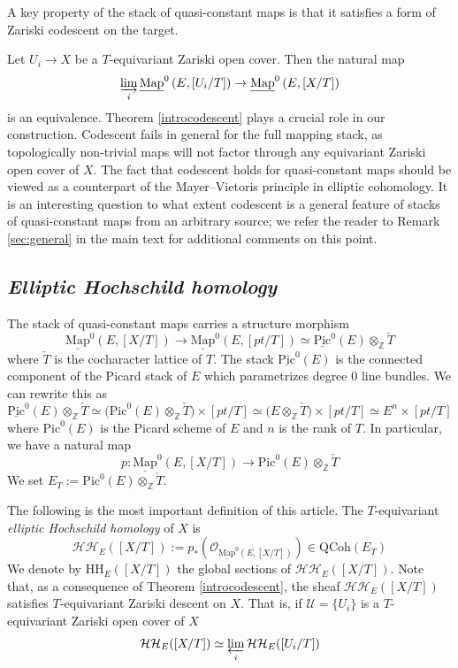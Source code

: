 \documentclass[11pt,letterpaper]{amsart}
\newenvironment{customthm}[1]
{\renewcommand\theinnercustomthm{#1}\innercustomthm}
  {\endinnercustomthm}
\newenvironment{customdef}[1]
{\renewcommand\theinnercustomdef{#1}\innercustomdef}
  {\endinnercustomdef}
\newcommand{\cU}{\mathcal{U}}
\newcommand{\Mapo}[2]{\underline{\mathrm{Map}}^{0}\left (#1,#2\right )}
\newcommand{\Pic}{\underline{\mathrm{Pic}}}
\newcommand{\QCoh}{\mathrm{QCoh}}
\begin{document}
A key property of the stack of quasi-constant maps is that it satisfies a form of Zariski codescent on the target. 



\begin{customthm}{A}[Theorem \ref{proposition:codescentnormalvar}]
\label{introcodescent}
Let $U_i \to X$ be a $T$-equivariant Zariski open cover. Then the natural map
$$
\varinjlim_i \Mapo{E}{[U_i/T]} \to 
\Mapo{E}{[X/T]}
$$
is an equivalence.
\end{customthm}
Theorem \ref{introcodescent} plays a crucial role in our construction. Codescent fails in general for the full mapping stack, as topologically non-trivial maps will not factor through any equivariant Zariski open cover of $X$. The fact that codescent holds for quasi-constant maps should be viewed as a counterpart of the Mayer--Vietoris principle in elliptic cohomology. It is an interesting question to what extent codescent is a general feature of  stacks of quasi-constant maps from an arbitrary source;  we refer the reader to Remark \ref{sec:general} in the main text for additional comments on this point. 

\subsection*{\emph{Elliptic Hochschild homology}}

The stack of quasi-constant maps carries a structure morphism  
$$
\Mapo{E}{[X/T]} \to \Mapo{E}{[pt/T]} \simeq \Pic^0(E) \otimes_\mathbb{Z} \check{T}
$$
where $\check{T}$ is the cocharacter lattice of $T$. The stack $\Pic^0(E)$ is the connected component of the Picard stack of $E$ which parametrizes degree $0$ line bundles. We can  rewrite this as 
$$
\Pic^0(E)\otimes_\mathbb{Z} \check{T}  \simeq \big ( \mathrm{Pic}^0(E)\otimes_\mathbb{Z} \check{T}\big ) \times [pt/T] 
 \simeq \big ( E \otimes_\mathbb{Z} \check{T} \big )\times [pt/T]  \simeq E^n \times [pt/T] 
$$
where $\mathrm{Pic}^0(E)$ is the Picard scheme of $E$ and $n$ is the rank of $T$. In particular, we have a natural map
$$
p: \Mapo{E}{[X/T]} \longrightarrow \mathrm{Pic}^0(E)  \otimes_\mathbb{Z} \check{T}
$$
We set $E_T:=\mathrm{Pic}^0(E)  \otimes_\mathbb{Z} \check{T}$.

The following is the most important definition of this article.
\begin{customdef}{B}[Definition \ref{elliptichoch}]
\label{mainintro}
The $T$-equivariant \emph{elliptic Hochschild homology}  of $X$ is 
$$
\mathcal{HH}_E([X/T]):=p_*(\mathcal{O}_{\Mapo{E}{[X/T]}}) \in \QCoh(E_T
)
$$
We denote by $\mathrm{HH}_E([X/T])$ the global sections of $\mathcal{HH}_E([X/T])$. 
\end{customdef}
Note that, as a consequence of Theorem \ref{introcodescent}, the sheaf $\mathcal{HH}_E([X/T])$ satisfies $T$-equivariant Zariski descent on $X$. That is, if $\cU=\{U_i\}$ is a $T$-equivariant Zariski open cover of $X$
$$
\mathcal{HH}_E([X/T]) \simeq \varprojlim_i \mathcal{HH}_E([U_i/T])
$$
\end{document}
